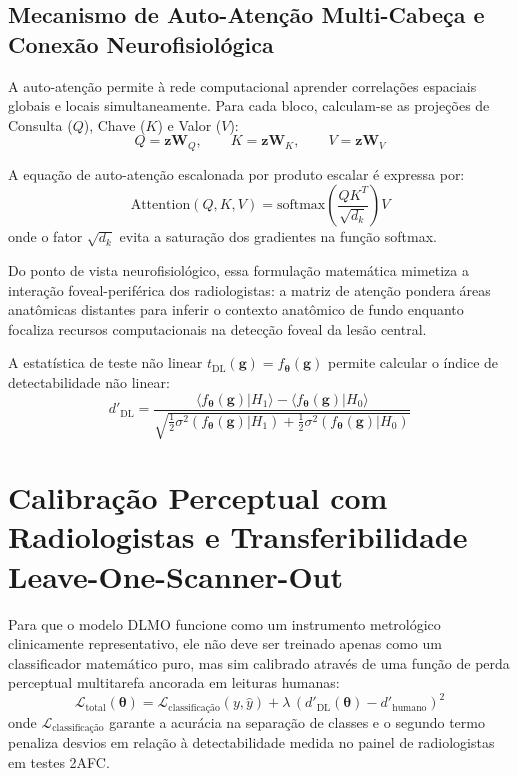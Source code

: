 \subsection{Mecanismo de Auto-Atenção Multi-Cabeça e Conexão Neurofisiológica}
A auto-atenção permite à rede computacional aprender correlações espaciais globais e locais simultaneamente. Para cada bloco, calculam-se as projeções de Consulta ($Q$), Chave ($K$) e Valor ($V$):
\begin{equation}
  Q = \mathbf{z} \mathbf{W}_Q, \qquad K = \mathbf{z} \mathbf{W}_K, \qquad V = \mathbf{z} \mathbf{W}_V
  \label{eq:qkv}
\end{equation}

A equação de auto-atenção escalonada por produto escalar é expressa por:
\begin{equation}
  \text{Attention}(Q, K, V) = \text{softmax}\left( \frac{Q K^T}{\sqrt{d_k}} \right) V
  \label{eq:attention_formula}
\end{equation}
onde o fator $\sqrt{d_k}$ evita a saturação dos gradientes na função softmax.

Do ponto de vista neurofisiológico, essa formulação matemática mimetiza a interação foveal-periférica dos radiologistas: a matriz de atenção pondera áreas anatômicas distantes para inferir o contexto anatômico de fundo enquanto focaliza recursos computacionais na detecção foveal da lesão central.

A estatística de teste não linear $t_{\text{DL}}(\mathbf{g}) = f_{\boldsymbol{\theta}}(\mathbf{g})$ permite calcular o índice de detectabilidade não linear:
\begin{equation}
  d'_{\text{DL}} = \frac{\langle f_{\boldsymbol{\theta}}(\mathbf{g}) | H_1 \rangle - \langle f_{\boldsymbol{\theta}}(\mathbf{g}) | H_0 \rangle}{\sqrt{\frac{1}{2}\sigma^2(f_{\boldsymbol{\theta}}(\mathbf{g})|H_1) + \frac{1}{2}\sigma^2(f_{\boldsymbol{\theta}}(\mathbf{g})|H_0)}}
  \label{eq:dprime_dl}
\end{equation}

\section{Calibração Perceptual com Radiologistas e Transferibilidade Leave-One-Scanner-Out}
\label{sec:loso}

Para que o modelo DLMO funcione como um instrumento metrológico clinicamente representativo, ele não deve ser treinado apenas como um classificador matemático puro, mas sim calibrado através de uma função de perda perceptual multitarefa ancorada em leituras humanas:
\begin{equation}
  \mathcal{L}_{\text{total}}(\boldsymbol{\theta}) = \mathcal{L}_{\text{classificação}}(y, \hat{y}) + \lambda \, \left( d'_{\text{DL}}(\boldsymbol{\theta}) - d'_{\text{humano}} \right)^2
  \label{eq:perceptual_loss}
\end{equation}
onde $\mathcal{L}_{\text{classificação}}$ garante a acurácia na separação de classes e o segundo termo penaliza desvios em relação à detectabilidade medida no painel de radiologistas em testes 2AFC.

